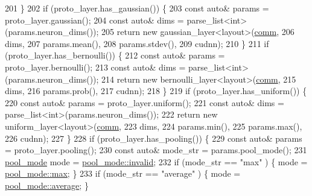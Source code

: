 \begin{DoxyCode}
201   \}
202   \textcolor{keywordflow}{if} (proto\_layer.has\_gaussian()) \{
203     \textcolor{keyword}{const} \textcolor{keyword}{auto}& params = proto\_layer.gaussian();
204     \textcolor{keyword}{const} \textcolor{keyword}{auto}& dims = parse\_list<int>(params.neuron\_dims());
205     \textcolor{keywordflow}{return} \textcolor{keyword}{new} gaussian\_layer<layout>(\hyperlink{file__io_8cpp_ab048c6f9fcbcfaa57ce68b00263dbebe}{comm},
206                                       dims,
207                                       params.mean(),
208                                       params.stdev(),
209                                       cudnn);
210   \}
211   \textcolor{keywordflow}{if} (proto\_layer.has\_bernoulli()) \{
212     \textcolor{keyword}{const} \textcolor{keyword}{auto}& params = proto\_layer.bernoulli();
213     \textcolor{keyword}{const} \textcolor{keyword}{auto}& dims = parse\_list<int>(params.neuron\_dims());
214     \textcolor{keywordflow}{return} \textcolor{keyword}{new} bernoulli\_layer<layout>(\hyperlink{file__io_8cpp_ab048c6f9fcbcfaa57ce68b00263dbebe}{comm},
215                                        dims,
216                                        params.prob(),
217                                        cudnn);
218   \}
219   \textcolor{keywordflow}{if} (proto\_layer.has\_uniform()) \{
220     \textcolor{keyword}{const} \textcolor{keyword}{auto}& params = proto\_layer.uniform();
221     \textcolor{keyword}{const} \textcolor{keyword}{auto}& dims = parse\_list<int>(params.neuron\_dims());
222     \textcolor{keywordflow}{return} \textcolor{keyword}{new} uniform\_layer<layout>(\hyperlink{file__io_8cpp_ab048c6f9fcbcfaa57ce68b00263dbebe}{comm},
223                                      dims,
224                                      params.min(),
225                                      params.max(),
226                                      cudnn);
227   \}
228   \textcolor{keywordflow}{if} (proto\_layer.has\_pooling()) \{
229     \textcolor{keyword}{const} \textcolor{keyword}{auto}& params = proto\_layer.pooling();
230     \textcolor{keyword}{const} \textcolor{keyword}{auto}& mode\_str = params.pool\_mode();
231     \hyperlink{base_8hpp_ac47a6ee5278a53898222a48639a2bf39}{pool\_mode} mode = \hyperlink{base_8hpp_ac47a6ee5278a53898222a48639a2bf39afedb2d84cafe20862cb4399751a8a7e3}{pool\_mode::invalid};
232     \textcolor{keywordflow}{if} (mode\_str == \textcolor{stringliteral}{"max"} )            \{ mode = \hyperlink{base_8hpp_ac47a6ee5278a53898222a48639a2bf39a2ffe4e77325d9a7152f7086ea7aa5114}{pool\_mode::max}; \}
233     \textcolor{keywordflow}{if} (mode\_str == \textcolor{stringliteral}{"average"} )        \{ mode = \hyperlink{base_8hpp_ac47a6ee5278a53898222a48639a2bf39a6927a3a7218a3195858411433ec20a21}{pool\_mode::average}; \}

\end{DoxyCode}
